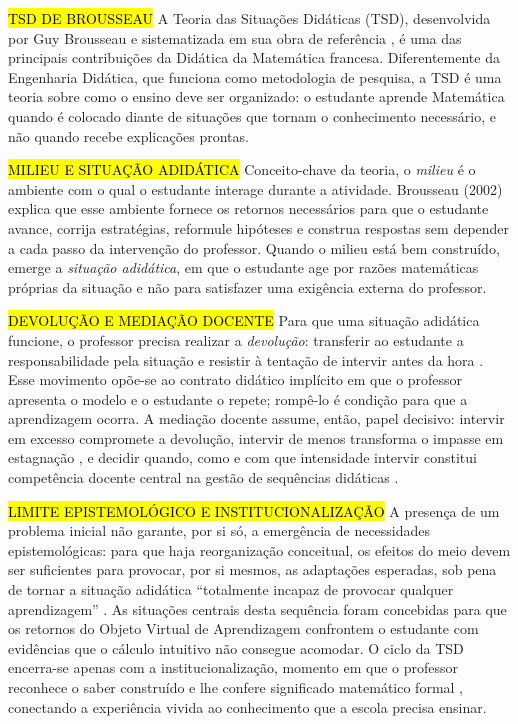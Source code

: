 {\hl {TSD DE BROUSSEAU} A Teoria das Situações Didáticas (TSD), desenvolvida por Guy Brousseau e sistematizada em sua obra de referência \cite{brousseau2002}, é uma das principais contribuições da Didática da Matemática francesa. Diferentemente da Engenharia Didática, que funciona como metodologia de pesquisa, a TSD é uma teoria sobre como o ensino deve ser organizado: o estudante aprende Matemática quando é colocado diante de situações que tornam o conhecimento necessário, e não quando recebe explicações prontas.

\hl {MILIEU E SITUAÇÃO ADIDÁTICA} Conceito-chave da teoria, o \emph{milieu} é o ambiente com o qual o estudante interage durante a atividade. Brousseau (2002) explica que esse ambiente fornece os retornos necessários para que o estudante avance, corrija estratégias, reformule hipóteses e construa respostas sem depender a cada passo da intervenção do professor. Quando o milieu está bem construído, emerge a \emph{situação adidática}, em que o estudante age por razões matemáticas próprias da situação e não para satisfazer uma exigência externa do professor.

\hl {DEVOLUÇÃO E MEDIAÇÃO DOCENTE} Para que uma situação adidática funcione, o professor precisa realizar a \emph{devolução}: transferir ao estudante a responsabilidade pela situação e resistir à tentação de intervir antes da hora \cite[p.~31]{brousseau2002}. Esse movimento opõe-se ao contrato didático implícito em que o professor apresenta o modelo e o estudante o repete; rompê-lo é condição para que a aprendizagem ocorra. A mediação docente assume, então, papel decisivo: intervir em excesso compromete a devolução, intervir de menos transforma o impasse em estagnação \cite{brousseau2002}, e decidir quando, como e com que intensidade intervir constitui competência docente central na gestão de sequências didáticas \cite[p.~159]{artigue2014}.

\hl{LIMITE EPISTEMOLÓGICO E INSTITUCIONALIZAÇÃO} A presença de um problema inicial não garante, por si só, a emergência de necessidades epistemológicas: para que haja reorganização conceitual, os efeitos do meio devem ser suficientes para provocar, por si mesmos, as adaptações esperadas, sob pena de tornar a situação adidática ``totalmente incapaz de provocar qualquer aprendizagem'' \cite[p.~58, tradução nossa]{brousseau2002}. As situações centrais desta sequência foram concebidas para que os retornos do Objeto Virtual de Aprendizagem confrontem o estudante com evidências que o cálculo intuitivo não consegue acomodar. O ciclo da TSD encerra-se apenas com a institucionalização, momento em que o professor reconhece o saber construído e lhe confere significado matemático formal \cite[p.~56]{brousseau1997}, conectando a experiência vivida ao conhecimento que a escola precisa ensinar.

}

